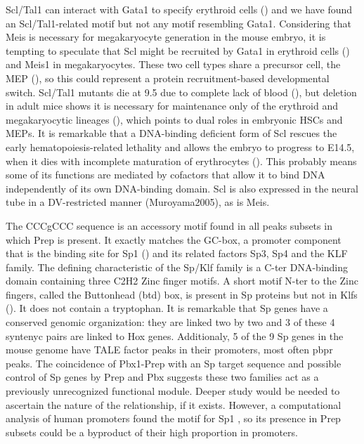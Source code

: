 Scl/Tal1 can interact with Gata1 to specify erythroid cells (\cite{ref}) and we have found an Scl/Tal1-related motif but not any motif resembling Gata1. Considering that Meis is necessary for megakaryocyte generation in the mouse embryo, it is tempting to speculate that Scl might be recruited by Gata1 in erythroid cells (\cite{Anguita2004}) and Meis1 in megakaryocytes. These two cell types share a precursor cell, the \ac{MEP} (\cite{ref}), so this could represent a protein recruitment-based developmental switch. Scl/Tal1 mutants die at 9.5 due to complete lack of blood (\cite{ref}), but deletion in adult mice shows it is necessary for maintenance only of the erythroid and megakaryocytic lineages (\cite{Mikkola2003}), which points to dual roles in embryonic \acp{HSC} and \acp{MEP}. It is remarkable that a DNA-binding deficient form of Scl rescues the early hematopoiesis-related lethality and allows the embryo to progress to E14.5, when it dies with incomplete maturation of erythrocytes (\cite{Porcher1999, Kassouf2008}). This probably means some of its functions are mediated by cofactors that allow it to bind DNA independently of its own DNA-binding domain. Scl is also expressed in the neural tube in a \ac{DV}-restricted manner (Muroyama2005), as is Meis.




The CCCgCCC sequence is an accessory motif found in all peaks subsets in which Prep is present. It exactly matches the GC-box, a promoter component that is the binding site for Sp1 (\cite{Kriwacki1992}) and its related factors Sp3, Sp4 and the KLF family. The defining characteristic of the Sp/Klf family is a \ac{C-ter} DNA-binding domain containing three C2H2 Zinc finger motifs. A short motif \ac{N-ter} to the Zinc fingers, called the Buttonhead (btd) box, is present in Sp proteins but not in Klfs (\cite{Suske2005}). It does not contain a tryptophan. It is remarkable that Sp genes have a conserved genomic organization: they are linked two by two and 3 of these 4 syntenyc pairs are linked to Hox genes. Additionaly, 5 of the 9 Sp genes in the mouse genome have \ac{TALE} factor peaks in their promoters, most often \ac{pbpr} peaks. The coincidence of Pbx1-Prep with an Sp target sequence and possible control of Sp genes by Prep and Pbx suggests these two families act as a previously unrecognized functional module. Deeper study would be needed to ascertain the nature of the relationship, if it exists. However, a computational analysis of human promoters found the motif for Sp1 \parencite{Hartmann2013}, so its presence in Prep subsets could be a byproduct of their high proportion in promoters.

